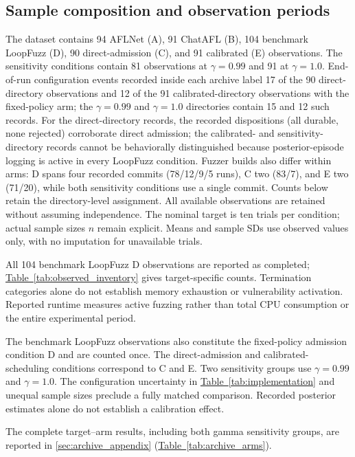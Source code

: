 \documentclass[final,5p,times,number]{elsarticle}
\newcommand{\namedref}[2]{\hyperref[#2]{#1~\ref*{#2}}}
\begin{document}
\subsection{Sample composition and observation periods}
The dataset contains 94 AFLNet (A), 91 ChatAFL (B), 104 benchmark LoopFuzz (D), 90 direct-admission (C), and 91 calibrated (E) observations. The sensitivity conditions contain 81 observations at $\gamma=0.99$ and 91 at $\gamma=1.0$. End-of-run configuration events recorded inside each archive label 17 of the 90 direct-directory observations and 12 of the 91 calibrated-directory observations with the fixed-policy arm; the $\gamma=0.99$ and $\gamma=1.0$ directories contain 15 and 12 such records. For the direct-directory records, the recorded dispositions (all durable, none rejected) corroborate direct admission; the calibrated- and sensitivity-directory records cannot be behaviorally distinguished because posterior-episode logging is active in every LoopFuzz condition. Fuzzer builds also differ within arms: D spans four recorded commits (78/12/9/5 runs), C two (83/7), and E two (71/20), while both sensitivity conditions use a single commit. Counts below retain the directory-level assignment. All available observations are retained without assuming independence. The nominal target is ten trials per condition; actual sample sizes $n$ remain explicit. Means and sample SDs use observed values only, with no imputation for unavailable trials.

All 104 benchmark LoopFuzz D observations are reported as completed; \namedref{Table}{tab:observed_inventory} gives target-specific counts. Termination categories alone do not establish memory exhaustion or vulnerability activation. Reported runtime measures active fuzzing rather than total CPU consumption or the entire experimental period.

The benchmark LoopFuzz observations also constitute the fixed-policy admission condition D and are counted once. The direct-admission and calibrated-scheduling conditions correspond to C and E. Two sensitivity groups use $\gamma=0.99$ and $\gamma=1.0$. The configuration uncertainty in \namedref{Table}{tab:implementation} and unequal sample sizes preclude a fully matched comparison. Recorded posterior estimates alone do not establish a calibration effect.


The complete target--arm results, including both gamma sensitivity groups, are reported in \ref{sec:archive_appendix} (\namedref{Table}{tab:archive_arms}).
\end{document}
